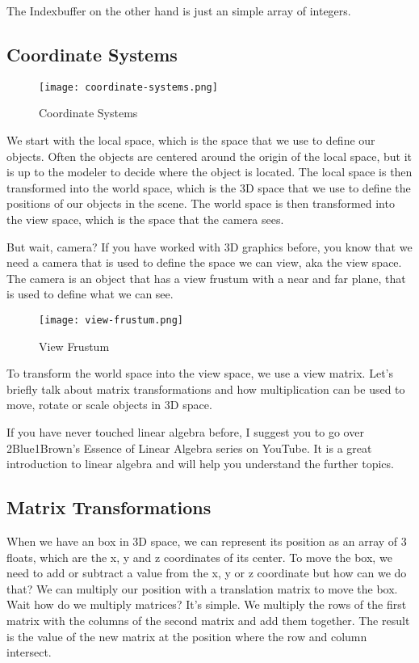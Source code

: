 \documentclass[12pt]{report} \usepackage{preamble}
\begin{document}
The Indexbuffer on the other hand is just an simple array of integers.
\cite{vulkan-tutorial-index-buffer}


\subsection{Coordinate Systems}

\begin{figure}[hbtp]
	\centering \texttt{[image: coordinate-systems.png]}
	\caption{Coordinate Systems \cite{fig:view-frustum}}
\end{figure}
\FloatBarrier

We start with the local space, which is the space that we use to define
our objects. Often the objects are centered around the origin of the
local space, but it is up to the modeler to decide where the object is
located. The local space is then transformed into the world space, which
is the 3D space that we use to define the positions of our objects in the scene.
The world space is then transformed into the view space, which is the space that the
camera sees. \cite{fig:view-frustum}

But wait, camera? If you have worked with 3D graphics before, you know
that we need a camera that is used to define the space we can view, aka
the view space. The camera is an object that has a view frustum
with a near and far plane, that is used to define what we can see.

\begin{figure}[hbtp]
	\centering \texttt{[image: view-frustum.png]}
	\caption{View Frustum \cite{fig:view-frustum}}
\end{figure}
\FloatBarrier

To transform the world space into the view space, we use a view matrix.
Let's briefly talk about matrix transformations and how multiplication
can be used to move, rotate or scale objects in 3D space.

If you have never touched linear algebra before, I suggest you to go over
2Blue1Brown's Essence of Linear Algebra series on YouTube. It is a great
introduction to linear algebra and will help you understand the further topics.

\subsection{Matrix Transformations}

When we have an box in 3D space, we can represent its position as an
array of 3 floats, which are the x, y and z coordinates of its center.
To move the box, we need to add or subtract a value from the x, y or
z coordinate but how can we do that? We can multiply our position with a translation matrix to
move the box. Wait how do we multiply matrices? It's simple. We multiply
the rows of the first matrix with the columns of the second matrix and add them
together. The result is the value of the new matrix at the position where the row and
column intersect.
\end{document}
